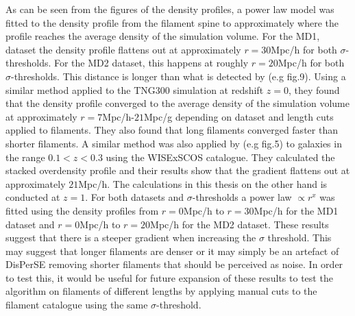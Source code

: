 As can be seen from the figures of the density profiles, a power law model was fitted to the density profile from the filament spine to approximately where the profile reaches the average density of the simulation volume. For the MD1, dataset the density profile flattens out at approximately $r=30$Mpc/h for both $\sigma$-thresholds. For the MD2 dataset, this happens at roughly $r=20$Mpc/h for both $\sigma$-thresholds. This distance is longer than what is detected by \cite{Gal_rraga_Espinosa_2020} (e.g fig.9). Using a similar method applied to the TNG300 simulation\cite{nelson2021illustristng} at redshift $z=0$, they found that the density profile converged to the average density of the simulation volume at approximately $r=7$Mpc/h-$21$Mpc/g depending on dataset and length cuts applied to filaments. They also found that long filaments converged faster than shorter filaments. A similar method was also applied by \cite{bonjean} (e.g fig.5) to galaxies in the range $0.1<z<0.3$ using the WISExSCOS catalogue\cite{Bilicki_2016}. They calculated the stacked overdensity profile and their results show that the gradient flattens out at approximately $21$Mpc/h. The calculations in this thesis on the other hand is conducted at $z=1$. For both datasets and $\sigma$-thresholds a power law $\propto r^x$ was fitted using the density profiles from $r=0$Mpc/h to $r=30$Mpc/h for the MD1 dataset and $r=0$Mpc/h to $r=20$Mpc/h for the MD2 dataset. These results suggest that there is a steeper gradient when increasing the $\sigma$ threshold. This may suggest that longer filaments are denser or it may simply be an artefact of DisPerSE removing shorter filaments that should be perceived as noise. In order to test this, it would be useful for future expansion of these results to test the algorithm on filaments of different lengths by applying manual cuts to the filament catalogue using the same $\sigma$-threshold.\\\indent
